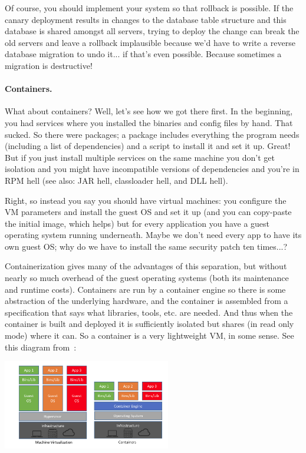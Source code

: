 \documentclass[a4paper]{report}
\begin{document}
Of course, you should implement your system so that rollback is possible. If the canary deployment results in changes to the database table structure and this database is shared amongst all servers, trying to deploy the change can break the old servers and leave a rollback implausible because we'd have to write a reverse database migration to undo it... if that's even possible. Because sometimes a migration is destructive!



\paragraph{Containers.} What about containers? Well, let's see how we got there first. In the beginning, you had services where you installed the binaries and config files by hand. That sucked. So there were packages; a package includes everything the program needs (including a list of dependencies) and a script to install it and set it up. Great! But if you just install multiple services on the same machine you don't get isolation and you might have incompatible versions of dependencies and you're in RPM hell (see also: JAR hell, classloader hell, and DLL hell).

Right, so instead you say you should have virtual machines: you configure the VM parameters and install the guest OS and set it up (and you can copy-paste the initial image, which helps) but for every application you have a guest operating system running underneath. Maybe we don't need every app to have its own guest OS; why do we have to install the same security patch ten times...?

Containerization gives many of the advantages of this separation, but without nearly so much overhead of the guest operating systems (both its maintenance and runtime costs). Containers are run by a container engine so there is some abstraction of the underlying hardware, and the container is assembled from a specification that says what libraries, tools, etc. are needed. And thus when the container is built and deployed it is sufficiently isolated but shares (in read only mode) where it can. So a container is a very lightweight VM, in some sense. See this diagram from~\cite{netappcontainer}:

\begin{center}
	\includegraphics[width=0.55\textwidth]{images/cvm.png}
\end{center}
\end{document}
